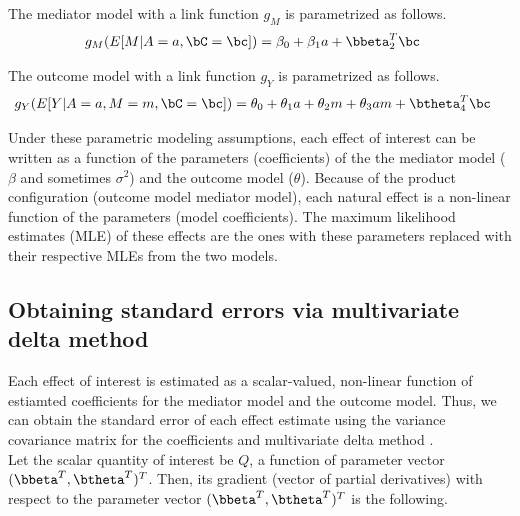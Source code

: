 \documentclass[10pt]{article}
\begin{document}
The mediator model with a link function \(g_{M}\) is parametrized as follows.
\begin{align*}
  g_{M}(E[M|A=a,\bC=\bc]) &= \beta_{0} + \beta_{1}a + \bbeta_{2}^{T}\bc
\end{align*}

The outcome model with a link function \(g_{Y}\) is parametrized as follows.
\begin{align*}
  g_{Y}(E[Y|A=a,M=m,\bC=\bc]) &= \theta_{0} + \theta_{1}a + \theta_{2}m + \theta_{3}am + \btheta_{4}^{T}\bc
\end{align*}

Under these parametric modeling assumptions, each effect of interest can be written as a function of the parameters (coefficients) of the the mediator model (\(\beta\) and sometimes \(\sigma^{2}\)) and the outcome model (\(\theta\)). Because of the product configuration (outcome model \texttimes{} mediator model), each natural effect is a non-linear function of the parameters (model coefficients). The maximum likelihood estimates (MLE) of these effects are the ones with these parameters replaced with their respective MLEs from the two models.

\subsection{Obtaining standard errors via multivariate delta method}
\label{sec:org77dcfdf}

Each effect of interest is estimated as a scalar-valued, non-linear function of estiamted coefficients for the mediator model and the outcome model. Thus, we can obtain the standard error of each effect estimate using the variance covariance matrix for the coefficients and multivariate delta method \cite{hoefWhoInventedDelta2012}.\\

Let the scalar quantity of interest be \(Q\), a function of parameter vector \((\bbeta^{T},\btheta^{T})^{T}\). Then, its gradient (vector of partial derivatives) with respect to the parameter vector \((\bbeta^{T},\btheta^{T})^{T}\) is the following.\\
\end{document}

